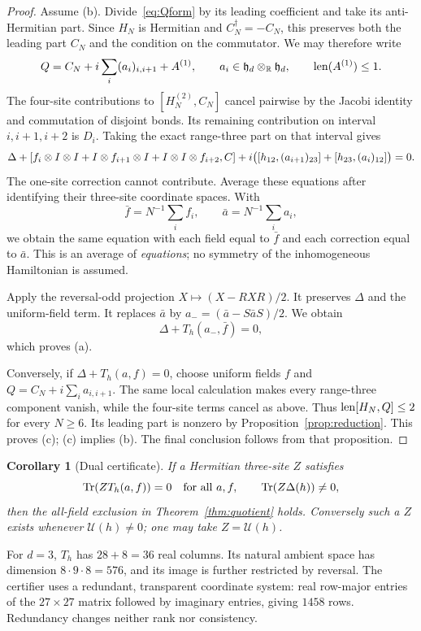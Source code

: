 \documentclass[11pt,a4paper]{article}
\numberwithin{equation}{section}
\newtheorem{corollary}[theorem]{Corollary}
\theoremstyle{definition}\newtheorem{definition}[theorem]{Definition}
\theoremstyle{remark}\newtheorem{remark}[theorem]{Remark}
\DeclareMathOperator{\Tr}{Tr}\DeclareMathOperator{\rank}{rank}
\begin{document}
\begin{proof}
Assume (b). Divide~\eqref{eq:Qform} by its leading coefficient and take its anti-Hermitian part. Since $H_N$ is Hermitian and $C_N^\dagger=-C_N$, this preserves both the leading part $C_N$ and the condition on the commutator. We may therefore write
\[
 Q=C_N+i\sum_i (a_i)_{i,i+1}+A^{(1)},
 \qquad a_i\in\mathfrak h_d\otimes_{\mathbb R}\mathfrak h_d,
 \qquad \operatorname{len}(A^{(1)})\le1.
\]
The four-site contributions to $[H_N^{(2)},C_N]$ cancel pairwise by the Jacobi identity and commutation of disjoint bonds. Its remaining contribution on interval $i,i+1,i+2$ is $D_i$. Taking the exact range-three part on that interval gives
\begin{equation}\label{eq:localeq}
 \Delta+[f_i\otimes I\otimes I+I\otimes f_{i+1}\otimes I+I\otimes I\otimes f_{i+2},C]
 +i\bigl([h_{12},(a_{i+1})_{23}]+[h_{23},(a_i)_{12}]\bigr)=0.
\end{equation}
The one-site correction cannot contribute. Average these equations after identifying their three-site coordinate spaces. With
\[
 \bar f=N^{-1}\sum_i f_i,\qquad \bar a=N^{-1}\sum_i a_i,
\]
we obtain the same equation with each field equal to $\bar f$ and each correction equal to $\bar a$. This is an average of \emph{equations}; no symmetry of the inhomogeneous Hamiltonian is assumed.

Apply the reversal-odd projection $X\mapsto(X-RXR)/2$. It preserves $\Delta$ and the uniform-field term. It replaces $\bar a$ by $a_-=(\bar a-S\bar aS)/2$. We obtain
\[
 \Delta+T_h(a_-,\bar f)=0,
\]
which proves (a).

Conversely, if $\Delta+T_h(a,f)=0$, choose uniform fields $f$ and
$Q=C_N+i\sum_i a_{i,i+1}$. The same local calculation makes every range-three component vanish, while the four-site terms cancel as above. Thus $\operatorname{len}[H_N,Q]\le2$ for every $N\ge6$. Its leading part is nonzero by Proposition~\ref{prop:reduction}. This proves (c); (c) implies (b). The final conclusion follows from that proposition.
\end{proof}

\begin{corollary}[Dual certificate]\label{cor:dual}
If a Hermitian three-site $Z$ satisfies
\[
 \Tr(ZT_h(a,f))=0\quad\hbox{for all }a,f,
 \qquad \Tr(Z\Delta(h))\ne0,
\]
then the all-field exclusion in Theorem~\ref{thm:quotient} holds. Conversely such a $Z$ exists whenever $\mathcal U(h)\ne0$; one may take $Z=\mathcal U(h)$.
\end{corollary}

For $d=3$, $T_h$ has $28+8=36$ real columns. Its natural ambient space has dimension $8\cdot9\cdot8=576$, and its image is further restricted by reversal. The certifier uses a redundant, transparent coordinate system: real row-major entries of the $27\times27$ matrix followed by imaginary entries, giving $1458$ rows. Redundancy changes neither rank nor consistency.
\end{document}
